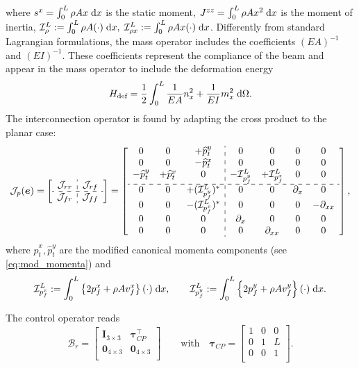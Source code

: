 where  $s^x = \int_{0}^{L} \rho A x \d{x}$ is the static moment, $J^{zz} = \int_{0}^{L} \rho A x^2 \d{x}$ is the moment of inertia, $\mathcal{I}_\rho^L := \int_{0}^L \rho A (\cdot) \d{x}, \; \mathcal{I}_{\rho x}^L := \int_{0}^L \rho A x (\cdot) \d{x}$. Differently from standard Lagrangian formulations, the mass operator includes the coefficients $(EA)^{-1}$ and $(EI)^{-1}$. These coefficients represent the compliance of the beam and appear in the mass operator to include the deformation energy
	\begin{equation*}
	H_{\text{def}} = \frac{1}{2}\int_{0}^L \frac{1}{EA} n_x^2 + \frac{1}{EI} m_x^2  \d\Omega.
	\end{equation*}
The interconnection operator is found by adapting the cross product to the planar case:
\begin{equation}
\label{eq:EB_J}
\mathcal{J}_{p}(\bm{e}) = 
\left[ \begin{array}{c:c}
{\mathcal{J}}_{rr} & {\mathcal{J}}_{rf} \\
\hdashline
{\mathcal{J}}_{fr} & {\mathcal{J}}_{ff} \\
\end{array} \right] = 
\left[ \begin{array}{ccc:cccc}
0 & 0 & +\widehat{p}_t^y      & 0 & 0 & 0 & 0 \\
0 & 0 & -\widehat{p}_t^x     & 0 & 0 & 0 & 0 \\
-\widehat{p}_t^y & +\widehat{p}_t^x & 0 & -\mathcal{I}_{p_f^y}^{L} & +\mathcal{I}_{p_f^x}^{L} & 0 & 0 \\
\hdashline 
0 & 0 & +(\mathcal{I}_{p_f^y}^{L})^* & 0 & 0 & \partial_x & 0  \\
0 & 0 & -(\mathcal{I}_{p_f^x}^{L})^* & 0 & 0 & 0 & -\partial_{xx} \\
0 & 0 & 0 & \partial_{x} & 0 & 0 & 0 \\
0 & 0 & 0 & 0 & \partial_{xx} & 0 & 0 \\
\end{array} \right],
\end{equation}
where $\widehat{p}_t^x, \widehat{p}_t^y$ are the modified canonical momenta components (see \eqref{eq:mod_momenta}) and 
$$\mathcal{I}_{p_f^x}^{L} := \int_{0}^{L} \left\{2 p_f^x + \rho A v_f^x \right\} (\cdot) \d{x}, \qquad \mathcal{I}_{p_f^y}^{L} := \int_{0}^{L} \left\{2 p_f^y + \rho A v_f^y \right\} (\cdot) \d{x}.$$ 

The control operator reads
\begin{equation}
{\mathcal{B}}_r = \begin{bmatrix}
\bm{I}_{3\times 3} & \bm\tau_{CP}^\top \\
\bm{0}_{4\times 3} & \bm{0}_{4\times 3} \\
\end{bmatrix} \qquad \text{with} \quad
\bm\tau_{CP} = \begin{bmatrix}
1 & 0 & 0 \\
0 & 1 & L \\
0 & 0 & 1 \\
\end{bmatrix}.
\end{equation}

